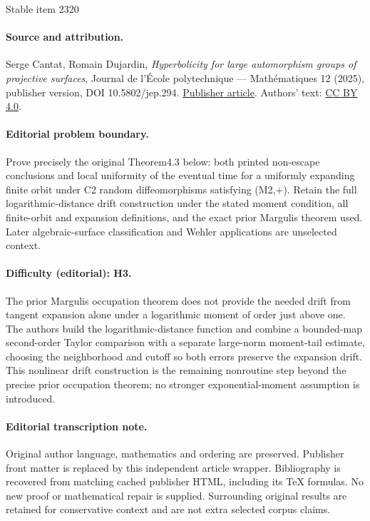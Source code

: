 \documentclass[11pt]{article}
\theoremstyle{plain}
\theoremstyle{definition}
\numberwithin{equation}{section}
\begin{document}
\begin{center}{\Large Stable item 2320}\end{center}
\paragraph{Source and attribution.}
Serge Cantat, Romain Dujardin, \emph{Hyperbolicity for large automorphism groups of projective surfaces}, Journal de l’École polytechnique — Mathématiques 12 (2025), publisher version, DOI 10.5802/jep.294. \href{https://jep.centre-mersenne.org/articles/10.5802/jep.294/}{Publisher article}. Authors' text: \href{https://creativecommons.org/licenses/by/4.0/}{CC BY 4.0}.
\paragraph{Editorial problem boundary.}
Prove precisely the original Theorem4.3 below: both printed non-escape conclusions and local uniformity of the eventual time for a uniformly expanding finite orbit under C2 random diffeomorphisms satisfying (M2,+). Retain the full logarithmic-distance drift construction under the stated moment condition, all finite-orbit and expansion definitions, and the exact prior Margulis theorem used. Later algebraic-surface classification and Wehler applications are unselected context.
\paragraph{Difficulty (editorial): H3.}
The prior Margulis occupation theorem does not provide the needed drift from tangent expansion alone under a logarithmic moment of order just above one. The authors build the logarithmic-distance function and combine a bounded-map second-order Taylor comparison with a separate large-norm moment-tail estimate, choosing the neighborhood and cutoff so both errors preserve the expansion drift. This nonlinear drift construction is the remaining nonroutine step beyond the precise prior occupation theorem; no stronger exponential-moment assumption is introduced.
\paragraph{Editorial transcription note.}
Original author language, mathematics and ordering are preserved. Publisher front matter is replaced by this independent article wrapper. Bibliography is recovered from matching cached publisher HTML, including its TeX formulas. No new proof or mathematical repair is supplied. Surrounding original results are retained for conservative context and are not extra selected corpus claims.
\clearpage
\end{document}
